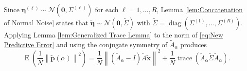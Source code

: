 \documentclass[12pt]{article}
\newcommand{\pVec}{\mathbf{p}}	%
\newcommand{\xVec}{\mathbf{x}}	%
\DeclareMathOperator{\trace}{trace}		%
\DeclareMathOperator{\diag}{diag}	%
\newcommand{\regparam}{\alpha}
\newcommand{\noise}{\eta}	%
\newcommand{\noiseVec}{\bm{\noise}}	%
\DeclareMathOperator{\E}{E}	%
\begin{document}
\noindent Since $\noiseVec^{(\ell)} \sim \mathcal{N}(\bm{0},\Sigma^{(\ell)})$ for each $\ell = 1,\ldots,R$, Lemma \ref{lem:Concatenation of Normal Noise} states that $\widetilde{\noiseVec} \sim \mathcal{N}(\bm{0},\widetilde{\Sigma})$ with $\widetilde{\Sigma} = \diag(\Sigma^{(1)},\ldots,\Sigma^{(R)})$.  Applying Lemma \ref{lem:Generalized Trace Lemma} to the norm of \eqref{eq:New Predictive Error} and using the conjugate symmetry of $\widetilde{A}_\regparam$ produces
\begin{equation}
\label{eq:New Predicitive Risk 1}
\E\left(\frac{1}{N}\left\|\widetilde{\pVec}(\regparam)\right\|^2\right) = \frac{1}{N}\left\|\left(\widetilde{A}_\regparam - I\right)\widetilde{A}\widetilde{\xVec}\right\|^2 + \frac{1}{N}\trace\left(\widetilde{A}_\regparam\widetilde{\Sigma}\widetilde{A}_\regparam \right).
\end{equation}
\end{document}
